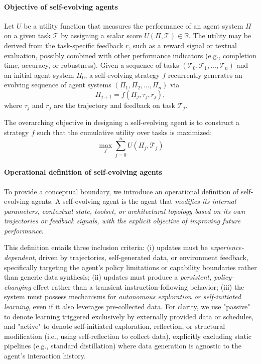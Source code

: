 \paragraph{Objective of self-evolving agents} 
Let $U$ be a utility function that measures the performance of an agent system $\Pi$ on a given task $\mathcal{T}$ by assigning a scalar score $U(\Pi, \mathcal{T}) \in \mathbb{R}$. The utility may be derived from the task-specific feedback $r$, such as a reward signal or textual evaluation, possibly combined with other performance indicators (e.g., completion time, accuracy, or robustness). Given a sequence of tasks $(\mathcal{T}_0, \mathcal{T}_1, ..., \mathcal{T}_n)$ and an initial agent system $\Pi_0$, a self-evolving strategy $f$ recurrently generates an evolving sequence of agent systems $(\Pi_1, \Pi_2, ..., \Pi_n)$ via
\begin{equation}
    \Pi_{j+1} = f(\Pi_j, \tau_j, r_j),
\end{equation}
where $\tau_j$ and $r_j$ are the trajectory and feedback on task $\mathcal{T}_j$. 

The overarching objective in designing a self-evolving agent is to construct a strategy $f$ such that the cumulative utility over tasks is maximized:
\begin{equation}
    \max_f \sum_{j=0}^n U(\Pi_j, \mathcal{T}_j)
\end{equation}

\paragraph{Operational definition of self-evolving agents}
To provide a conceptual boundary, we introduce an operational definition of self-evolving agents. 
A self-evolving agent is the agent that \emph{modifies its internal parameters, contextual state, toolset, or architectural topology based on its own trajectories or feedback signals, with the explicit objective of improving future performance}. 

This definition entails three inclusion criteria: 
(i) updates must be \emph{experience-dependent}, driven by trajectories, self-generated data, or environment feedback, specifically targeting the agent's policy limitations or capability boundaries rather than generic data synthesis; 
(ii) updates must produce a \emph{persistent, policy-changing} effect rather than a transient instruction-following behavior; 
(iii) the system must possess mechanisms for \emph{autonomous exploration or self-initiated learning}, even if it also leverages pre-collected data. For clarity, we use "passive" to denote learning triggered exclusively by externally provided data or schedules, and "active" to denote self-initiated exploration, reflection, or structural modification (i.e., using self-reflection to collect data), explicitly excluding static pipelines (e.g., standard distillation) where data generation is agnostic to the agent's interaction history.


